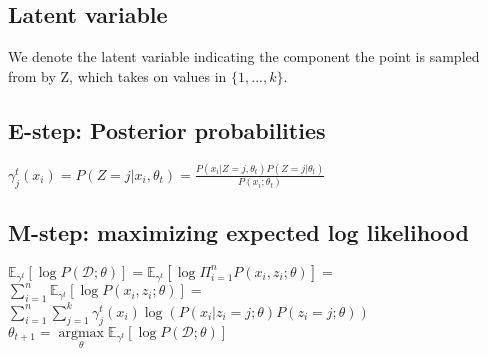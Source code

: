 \subsection*{Latent variable}
We denote the latent variable indicating the component the point is sampled from by Z, which takes on values in $\{1,...,k\}$.

\subsection*{E-step: Posterior probabilities}
$\gamma_j^t(x_i) = P(Z=j|x_i, \theta_t) = \frac{P(x_i|Z=j, \theta_t) P(Z=j|\theta_t)}{P(x_i;\theta_t)}$

\subsection*{M-step: maximizing expected log likelihood}
$\mathbb{E}_{\gamma^t}[\log P(\mathcal{D;\theta})] = 
\mathbb{E}_{\gamma^t}[\log \Pi_{i=1}^nP(x_i,z_i;\theta)] = $ \\
$\sum_{i=1}^n \mathbb{E}_{\gamma^t}[\log P(x_i,z_i;\theta)] = $ \\
$\sum_{i=1}^n \sum_{j=1}^k \gamma_j^t(x_i) \log (P(x_i|z_i=j;\theta) P(z_i=j;\theta))$ \\
$\theta_{t+1} = \underset{\theta}{\operatorname{argmax}} \mathbb{E}_{\gamma^t}[\log P(\mathcal{D;\theta})]$



\fi

